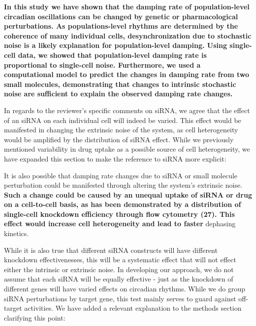 \documentclass[11pt, letterpaper]{article}
\newenvironment{manuscript}[1]{\begin{center}\begin{tcolorbox}[colback=green!5!white,colframe=green!75!black,width=\textwidth,title={#1},breakable,fonttitle=\bfseries]}{\end{tcolorbox}\end{center}}
\begin{document}
\begin{manuscript}{Page 7}
  {\bfseries In this study we have shown that the damping rate of population-level circadian oscillations can be changed by genetic or pharmacological perturbations.
As populations-level rhythms are determined by the coherence of many individual cells, desynchronization due to stochastic noise is a likely explanation for population-level damping.
Using single-cell data, we showed that population-level damping rate is proportional to single-cell noise.
Furthermore, we used a computational model to predict the changes in damping rate from two small molecules, demonstrating that changes to intrinsic stochastic noise are sufficient to explain the observed damping rate changes.}
\end{manuscript}

In regards to the reviewer's specific comments on siRNA, we agree that the effect of an siRNA on each individual cell will indeed be varied.
This effect would be manifested in changing the extrinsic noise of the system, as cell heterogeneity would be amplified by the distribution of siRNA effect.
While we previously mentioned variability in drug uptake as a possible source of cell heterogeneity, we have expanded this section to make the reference to siRNA more explicit:

\begin{manuscript}{Pages 6-7}
It is also possible that damping rate changes due to siRNA or small molecule perturbation could be manifested through altering the system’s extrinsic noise. 
{\bfseries Such a change could be caused by an unequal uptake of siRNA or drug on a cell-to-cell basis, as has been demonstrated by a distribution of single-cell knockdown efficiency through flow cytometry (27). 
This effect would increase cell heterogeneity and lead to faster} dephasing kinetics.
\end{manuscript}

While it is also true that different siRNA constructs will have different knockdown effectivenesses, this will be a systematic effect that will not effect either the intrinsic or extrinsic noise.
In developing our approach, we do not assume that each siRNA will be equally effective - just as the knockdown of different genes will have varied effects on circadian rhythms.
While we do group siRNA perturbations by target gene, this test mainly serves to guard against off-target activities.
We have added a relevant explanation to the methods section clarifying this point:
\end{document}
